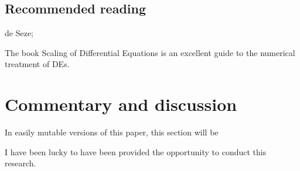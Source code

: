 \documentclass[fleqn,10pt]{paper}
\begin{document}
\subsection*{Recommended reading}

de Seze; 

The book Scaling of Differential Equations is an excellent guide to the numerical treatment of DEs.

\section*{Commentary and discussion}

In easily mutable versions of this paper, this section will be 



I have been lucky to have been provided the opportunity to conduct this research. 
\end{document}
